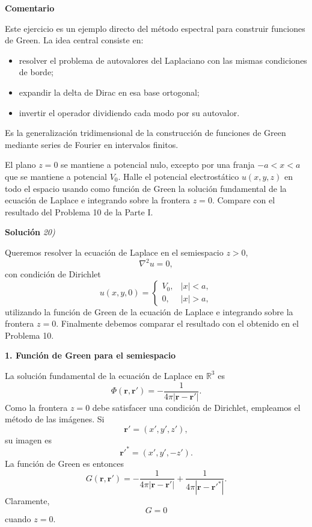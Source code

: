 \documentclass[11pt,spanish]{article}
\newcounter{problema}
\newcommand{\prob}{\stepcounter{problema} \vspace{.5cm} \noindent{\bf Problema \arabic{problema}: }}
\begin{document}
{\bf Comentario}

Este ejercicio es un ejemplo directo del método espectral para construir funciones de Green. 
La idea central consiste en:
\begin{itemize}
\item resolver el problema de autovalores del Laplaciano con las mismas condiciones de borde;
\item expandir la delta de Dirac en esa base ortogonal;
\item invertir el operador dividiendo cada modo por su autovalor.
\end{itemize}
Es la generalización tridimensional de la construcción de funciones de Green mediante series de Fourier en intervalos finitos.










\prob El plano \(z=0\) se mantiene a potencial nulo, excepto por una franja \(-a<x<a\) que se mantiene a potencial \(V_0\). Halle el potencial electrostático \(u(x,y,z)\) en todo el espacio usando como función de Green la solución fundamental de la ecuación de Laplace e integrando sobre la frontera \(z=0\). Compare con el resultado del Problema 10 de la Parte I.

\vspace{0.5cm}
{\bf Soluci\'on }{\em 20)}
\vspace{0.5cm}

Queremos resolver la ecuación de Laplace en el semiespacio $z>0$,
$$
\nabla^2u=0,
$$
con condición de Dirichlet
$$
u(x,y,0)=
\begin{cases}
V_0,& |x|<a,\\
0,& |x|>a,
\end{cases}
$$
utilizando la función de Green de la ecuación de Laplace e integrando sobre la frontera $z=0$.
Finalmente debemos comparar el resultado con el obtenido en el Problema 10. 

{\bf 1. Función de Green para el semiespacio}

La solución fundamental de la ecuación de Laplace en $\mathbb R^3$ es
$$
\Phi(\mathbf r,\mathbf r')
=
-\frac1{4\pi |\mathbf r-\mathbf r'|}.
$$
Como la frontera $z=0$ debe satisfacer una condición de Dirichlet, empleamos el método de las imágenes.
Si
$$
\mathbf r'=(x',y',z'),
$$
su imagen es
$$
\mathbf r'^*=(x',y',-z').
$$
La función de Green es entonces
$$
G(\mathbf r,\mathbf r')
=
-\frac1{4\pi|\mathbf r-\mathbf r'|}
+
\frac1{4\pi|\mathbf r-\mathbf r'^*|}.
$$
Claramente,
$$
G=0
$$
cuando $z=0$.
\end{document}
